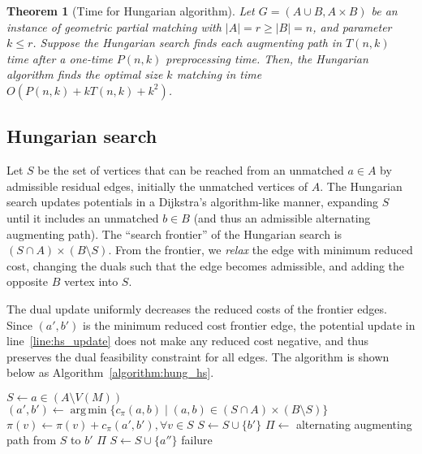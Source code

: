 \documentclass[11pt]{article}
\makeatletter
\DeclareMathOperator*{\argmin}{arg\,min}
\theoremstyle{plain}
\newtheorem{theorem}[lemma]{Theorem}
\numberwithin{figure}{section}
\def\n@te#1{\textsf{\boldmath \textbf{$\langle\!\langle$#1$\rangle\!\rangle$}}\leavevmode}
\def\note#1{\textcolor{red}{\n@te{#1}}}
\makeatother
\begin{document}
\begin{theorem}[Time for Hungarian algorithm]
\label{theorem:hung_orig}
Let $G = (A \cup B, A \times B)$ be an instance of geometric partial matching
with $|A| = r \geq |B| = n$, and parameter $k \leq r$.
Suppose the Hungarian search finds each augmenting path in $T(n, k)$ time after
a one-time $P(n, k)$ preprocessing time.
Then, the Hungarian algorithm finds the optimal size $k$ matching in time
$O(P(n, k) + k T(n, k) + k^2)$.
\end{theorem}

\subsection{Hungarian search}

Let $S$ be the set of vertices that can be reached from an unmatched $a \in A$
by admissible residual edges, initially the unmatched vertices of $A$.
The Hungarian search updates potentials in a Dijkstra's algorithm-like manner,
expanding $S$ until it includes an unmatched $b \in B$ (and thus an admissible
alternating augmenting path).
The ``search frontier'' of the Hungarian search is
$(S \cap A) \times (B \setminus S)$.
From the frontier, we \emph{relax} the edge with minimum reduced cost, changing
the duals such that the edge becomes admissible, and adding the opposite $B$
vertex into $S$.

The dual update uniformly decreases the reduced costs of the frontier edges.
Since $(a', b')$ is the minimum reduced cost frontier edge, the potential
update in line~\ref{line:hs_update} does not make any reduced cost negative,
and thus preserves the dual feasibility constraint for all edges.
The algorithm is shown below as Algorithm~\ref{algorithm:hung_hs}.

\begin{figure*}
\centering
\begin{minipage}{.8\linewidth}
\begin{algorithm}[H]
\caption{Hungarian Search (matching)}
\label{algorithm:hung_hs}
\begin{algorithmic}[1]
	\State $S \gets a \in (A \setminus V(M))$
	\Repeat
		\State $(a', b') \gets \argmin\{c_\pi(a, b) \mid (a, b) \in (S \cap A) \times (B \setminus S)\}$
		\State $\pi(v) \gets \pi(v) + c_\pi(a', b'), \forall v \in S$
			\label{line:hs_update}
		\State $S \gets S \cup \{b'\}$
		 
			\State $\Pi \gets$ alternating augmenting path from $S$ to $b'$
			\State\Return $\Pi$
		\Else {}
			\State $S \gets S \cup \{a''\}$
		\EndIf
	\State\Return failure
\EndFunction
\end{algorithmic}
\end{algorithm}
\end{minipage}
\end{figure*}
\end{document}
